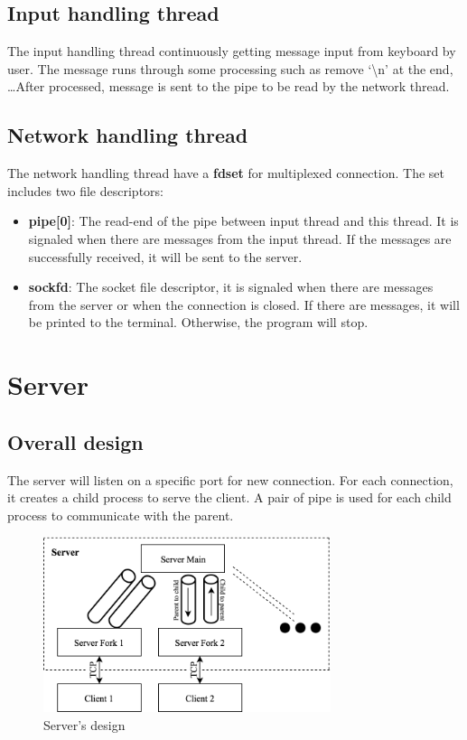 \documentclass[12pt]{article}
\begin{document}
\subsection{Input handling thread}

The input handling thread continuously getting message input from keyboard by user. The message runs through some processing such as remove `\textbackslash n' at the end, \dots After processed, message is sent to the pipe to be read by the network thread.

\subsection{Network handling thread}

The network handling thread have a \textbf{fdset} for multiplexed connection. The set includes two file descriptors:

\begin{itemize}
\item \textbf{pipe[0]}: The read-end of the pipe between input thread and this thread. It is signaled when there are messages from the input thread. If the messages are successfully received, it will be sent to the server.

\item \textbf{sockfd}: The socket file descriptor, it is signaled when there are messages from the server or when the connection is closed. If there are messages, it will be printed to the terminal. Otherwise, the program will stop.
\end{itemize}

\section{Server}

\subsection{Overall design}

The server will listen on a specific port for new connection. For each connection, it creates a child process to serve the client. A pair of pipe is used for each child process to communicate with the parent.

\begin{figure}[H]
\centering
\includegraphics[width=0.75\textwidth]{server_diagram.png}
\caption{Server's design}
\end{figure}
\end{document}
